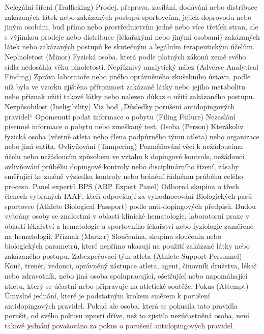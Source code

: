 \dend
\dt Nelegální šíření (Trafficking)
\dd Prodej, přeprava, zasílání, dodávání nebo distribuce zakázaných látek nebo zakázaných postupů sportovcům, jejich doprovodu nebo jiným osobám, buď přímo nebo prostřednictvím jedné nebo více třetích stran, ale s výjimkou prodeje nebo distribuce (lékařskými nebo jinými osobami) zakázaných látek nebo zakázaných postupů ke skutečným a legálním terapeutickým účelům.
\dend
\dt Neplnoletost (Minor)
\dd Fyzická osoba, která podle platných zákonů země svého sídla nedosáhla věku plnoletosti.
\dend
\dt Nepříznivý analytický nález (Adverse Analytical Finding)
\dd Zpráva laboratoře nebo jiného oprávněného zkušebního ústavu, podle níž byla ve vzorku zjištěna přítomnost zakázané látky nebo jejího metabolitu nebo příznak užití takové látky nebo nalezen důkaz o užití zakázaného postupu.
\dend
\dt Nezpůsobilost (Ineligibility)
\dd Viz bod „Důsledky porušení antidopingových pravidel“
\dend
\dt Opomenutí podat informace o pobytu (Filing Failure)
\dd Nezaslání písemné informace o pobytu nebo zmeškaný test.
\dend
\dt Osoba (Person)
\dd Kterákoliv fyzická osoba (včetně atleta nebo člena podpůrného týmu atleta) nebo organizace nebo jiná entita.
\dend
\dt Ovlivňování (Tampering)
\dd Pozměňování věci k nežádoucímu účelu nebo nežádoucím způsobem ve vztahu k dopingové kontrole, nežádoucí ovlivňování průběhu dopingové kontroly nebo disciplinárního řízení, zásahy směřující ke změně výsledku kontroly nebo bránění řádnému průběhu celého procesu.
\dend
\dt Panel expertů BPS (ABP Expert Panel)
\dd Odborná skupina o třech členech vybraných IAAF, kteří odpovídají za vyhodnocování Biologických pasů sportovce (Athlete Biological Passport) podle anti-dopingových předpisů. Budou vybrány osoby se znalostmi v oblasti klinické hematologie, laboratorní praxe v oblasti lékařství a hematologie a sportovního lékařství nebo fyziologie zaměřené na hematologii.
\dend
\dt Příznak (Marker)
\dd Sloučenina, skupina sloučenin nebo biologických parametrů, které nepřímo ukazují na použití zakázané látky nebo zakázaného postupu.
\dend
\dt Zabezpečovací tým atleta (Athlete Support Personnel)
\dd Kouč, trenér, vedoucí, oprávněný zástupce atleta, agent, činovník družstva, lékař nebo zdravotník, nebo jiná osoba spolupracující, ošetřující nebo napomáhající atletu, který se účastní nebo připravuje na atletické soutěže.
\dend
\dt Pokus (Attempt)
\dd Úmyslné jednání, které je podstatným krokem směrem k porušení antidopingových pravidel. Pokud  ale osoba, která se pokusila tato pravidla porušit, od svého pokusu upustí dříve, než to zjistila nezúčastněná osoba, není takové jednání považováno za pokus o porušení antidopingových pravidel.

